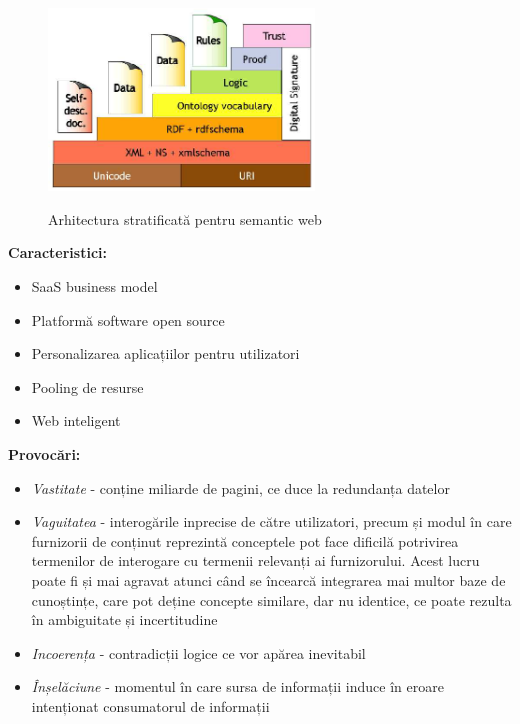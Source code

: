 \documentclass[12pt, a4paper]{report}
\begin{document}
\begin{figure}[htbp]
	\centering
	\includegraphics[width=0.63\textwidth]{layered_architecture.png} \label{fig:layered}
	\caption{Arhitectura stratificată pentru semantic web}
\end{figure}



\textbf{Caracteristici:}
\begin{itemize}
	\item SaaS business model
	\item Platformă software open source
	\item Personalizarea aplicațiilor pentru utilizatori
	\item Pooling de resurse
	\item Web inteligent
\end{itemize}


\textbf{Provocări:}
\begin{itemize}
	\item \emph{Vastitate} - conține miliarde de pagini, ce duce la redundanța datelor
	\item \emph{Vaguitatea} - interogările inprecise de către utilizatori, precum și modul în care furnizorii de conținut reprezintă conceptele pot face dificilă potrivirea termenilor de interogare cu termenii relevanți ai furnizorului. Acest lucru poate fi și mai agravat atunci când se încearcă integrarea mai multor baze de cunoștințe, care pot deține concepte similare, dar nu identice, ce poate rezulta în ambiguitate și incertitudine
	\item \emph{Incoerența} - contradicții logice ce vor apărea inevitabil
	\item \emph{Înșelăciune} - momentul în care sursa de informații induce în eroare intenționat consumatorul de informații
\end{itemize}



\end{document}
